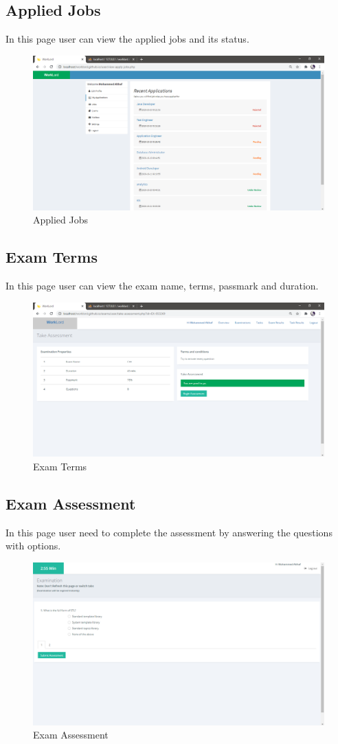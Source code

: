 \documentclass[a4paper,12pt]{report}
\begin{document}
\subsection {Applied Jobs}
In this page user can view the applied jobs and its status.
\begin{figure}[bph]
	\centering
	\includegraphics[width=.7\linewidth ]{img/screenshots/user/job_Applications}
	\caption{Applied Jobs}
\end{figure}

\pagebreak

\subsection {Exam Terms}
In this page user can view the exam name, terms, passmark and duration.
\begin{figure}[bph]
	\centering
	\includegraphics[width=.7\linewidth ]{img/screenshots/user/assess_terms}
	\caption{Exam Terms}
\end{figure}

\subsection {Exam Assessment}
In this page user need to complete the assessment by answering the questions with options. 
\begin{figure}[bph]
	\centering
	\includegraphics[width=.7\linewidth ]{img/screenshots/user/assessment}
	\caption{Exam Assessment}
\end{figure}
\end{document}
